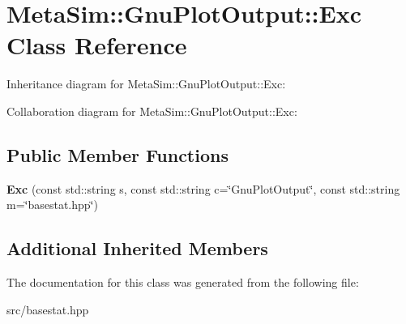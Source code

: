 \hypertarget{classMetaSim_1_1GnuPlotOutput_1_1Exc}{}\section{Meta\+Sim\+:\+:Gnu\+Plot\+Output\+:\+:Exc Class Reference}
\label{classMetaSim_1_1GnuPlotOutput_1_1Exc}


Inheritance diagram for Meta\+Sim\+:\+:Gnu\+Plot\+Output\+:\+:Exc\+:


Collaboration diagram for Meta\+Sim\+:\+:Gnu\+Plot\+Output\+:\+:Exc\+:
\subsection*{Public Member Functions}
\begin{DoxyCompactItemize}
\item 
{\bfseries Exc} (const std\+::string s, const std\+::string c=\char`\"{}Gnu\+Plot\+Output\char`\"{}, const std\+::string m=\char`\"{}basestat.\+hpp\char`\"{})
\end{DoxyCompactItemize}
\subsection*{Additional Inherited Members}


The documentation for this class was generated from the following file\+:\begin{DoxyCompactItemize}
\item 
src/basestat.\+hpp\end{DoxyCompactItemize}
